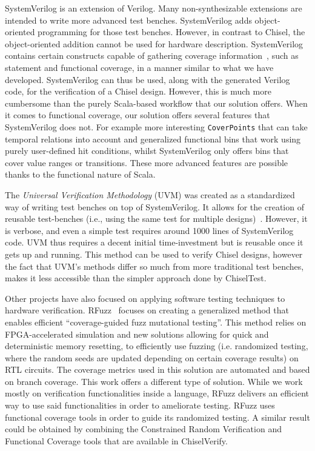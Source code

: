\documentclass[conference]{IEEEtran}
\begin{document}
SystemVerilog is an extension of Verilog. Many non-synthesizable extensions are intended
to write more advanced test benches. SystemVerilog adds object-oriented programming
for those test benches. However, in contrast to Chisel, the object-oriented addition cannot be
used for hardware description.
SystemVerilog contains certain constructs capable of gathering coverage information~\cite{spear2008systemverilog}, such as statement and functional coverage, in a manner similar to what we have developed. SystemVerilog can thus be used, along with the generated Verilog code, for the verification of a Chisel design. However, this is much more cumbersome than the purely Scala-based workflow that our solution offers. When it comes to functional coverage, our solution offers several features that SystemVerilog does not. For example more interesting \texttt{CoverPoints} that can take temporal relations into account and generalized functional bins that work using purely user-defined hit conditions, whilst SystemVerilog only offers bins that cover value ranges or transitions. These more advanced features are possible thanks to the functional nature of Scala. 

The \textit{Universal Verification Methodology} (UVM) was created as a standardized way of writing test benches on top of SystemVerilog. It allows for the creation of reusable test-benches (i.e., using the same test for multiple designs)~\cite{uvm2015}. However, it is verbose, and even a simple test requires around 1000 lines of SystemVerilog code. UVM thus requires a decent initial time-investment but is reusable once it gets up and running. This method can be used to verify Chisel designs, however the fact that UVM's methods differ so much from more traditional test benches, makes it less accessible than the simpler approach done by ChiselTest.


Other projects have also focused on applying software testing techniques to hardware verification. RFuzz~\cite{rfuzz2018} focuses on creating a generalized method that enables efficient ``coverage-guided fuzz mutational testing''. This method relies on FPGA-accelerated simulation and new solutions allowing for quick and deterministic memory resetting, to efficiently use fuzzing (i.e. randomized testing, where the random seeds are updated depending on certain coverage results) on RTL circuits. The coverage metrics used in this solution are automated and based on branch coverage. This work offers a different type of solution. While we work mostly on verification functionalities inside a language, RFuzz delivers an efficient way to use said functionalities in order to ameliorate testing. RFuzz uses functional coverage tools in order to guide its randomized testing. A similar result could be obtained by combining the Constrained Random Verification and Functional Coverage tools that are available in ChiselVerify.
\end{document}
